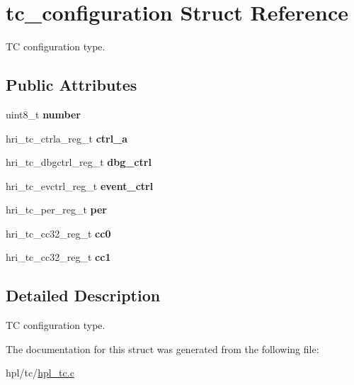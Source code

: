 \hypertarget{structtc__configuration}{}\section{tc\+\_\+configuration Struct Reference}
\label{structtc__configuration}


TC configuration type.  


\subsection*{Public Attributes}
\begin{DoxyCompactItemize}
\item 
\mbox{\label{structtc__configuration_ab10b40ff18d7101b52d145840e69a7ea}} 
uint8\+\_\+t {\bfseries number}
\item 
\mbox{\label{structtc__configuration_a6bf6bf315526307d736afeb3be616601}} 
hri\+\_\+tc\+\_\+ctrla\+\_\+reg\+\_\+t {\bfseries ctrl\+\_\+a}
\item 
\mbox{\label{structtc__configuration_ac6229e55338eb19b86dd96041513e215}} 
hri\+\_\+tc\+\_\+dbgctrl\+\_\+reg\+\_\+t {\bfseries dbg\+\_\+ctrl}
\item 
\mbox{\label{structtc__configuration_a07a43b7db5f5d3b64dca05dfe13b10df}} 
hri\+\_\+tc\+\_\+evctrl\+\_\+reg\+\_\+t {\bfseries event\+\_\+ctrl}
\item 
\mbox{\label{structtc__configuration_a599ff9a6faf0025ec3bc5efe08417aa2}} 
hri\+\_\+tc\+\_\+per\+\_\+reg\+\_\+t {\bfseries per}
\item 
\mbox{\label{structtc__configuration_ad98e4fa5f684a54224e6339ca1877a18}} 
hri\+\_\+tc\+\_\+cc32\+\_\+reg\+\_\+t {\bfseries cc0}
\item 
\mbox{\label{structtc__configuration_a5af8ed54afd6a8195d029e8f0661383f}} 
hri\+\_\+tc\+\_\+cc32\+\_\+reg\+\_\+t {\bfseries cc1}
\end{DoxyCompactItemize}


\subsection{Detailed Description}
TC configuration type. 

The documentation for this struct was generated from the following file\+:\begin{DoxyCompactItemize}
\item 
hpl/tc/\hyperlink{hpl__tc_8c}{hpl\+\_\+tc.\+c}\end{DoxyCompactItemize}

